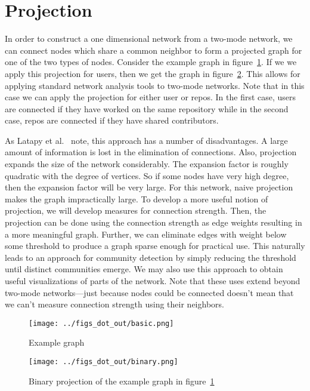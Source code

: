 \documentclass{pset}
\begin{document}
\section*{Projection}

In order to construct a one dimensional network from a two-mode network, we can
connect nodes which share a common neighbor to form a projected graph for one
of the two types of nodes.  Consider the example graph in
figure~\ref{fig:example}.  If we we apply this projection for users, then we
get the graph in figure~\ref{fig:binary}.  This allows for applying standard
network analysis tools to two-mode networks. Note that in this case we can apply
the projection for either user or repos. In the first case, 
users are connected if they have worked on the same repository while in the
second case, repos are connected if they have shared contributors.

As Latapy et al.~\cite{latapy} note, this approach has a number of
disadvantages. A large amount of information is lost in the elimination of
connections. Also, projection expands the size of the network considerably. The
expansion factor is roughly quadratic with the degree of vertices. So if some
nodes have very high degree, then the expansion factor will
be very large.  For this network, naive projection makes the graph
impractically large. To develop a more useful notion of projection, we will
develop measures for connection strength.  Then, the projection can be done
using the connection strength as edge weights resulting in a more meaningful
graph. Further, we can eliminate edges with weight below some threshold to
produce a graph sparse enough for practical use. This naturally leads to an
approach for community detection by simply reducing the threshold until
distinct communities emerge. We may also use this approach to obtain useful
visualizations of parts of the network. Note that these uses extend beyond
two-mode networks---just because nodes could be connected doesn't mean that we
can't measure connection strength using their neighbors.

\begin{figure}[ht]
\centering
\texttt{[image: ../figs\_dot\_out/basic.png]}
\caption{Example graph}\label{fig:example}
\end{figure}

\begin{figure}[ht]
\centering
\texttt{[image: ../figs\_dot\_out/binary.png]}
\caption{Binary projection of the example graph in figure~\ref{fig:example}}\label{fig:binary}
\end{figure}
\end{document}
